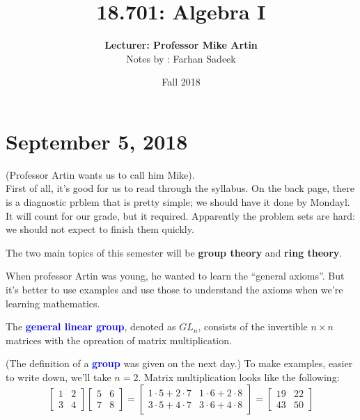 \documentclass[11pt]{article}
\title{\textbf{18.701: Algebra I}}
\author{\textbf{Lecturer: Professor Mike Artin} \\ Notes by : Farhan Sadeek}
\date{Fall 2018}
\begin{document}
\maketitle
\section{September 5, 2018}
 (Professor Artin wants us to call him Mike). \\
First of all, it's good for us to read through the syllabus. On the back page, there is a diagnostic prblem that is pretty simple; we should have it done by Mondayl. It will count for our grade, but it  required. Apparently the problem sets are hard: we should not expect to finish them quickly.
\begin{fact}
    The two main topics of this semester will be \textbf{group theory} and \textbf{ring theory}.
\end{fact}
When professor Artin was young, he wanted to learn the ``general axioms''. But it's better to use examples and use those to understand the axioms when we're learning mathematics.

\begin{definition}
    The \textcolor{blue}{\textbf{general linear group}}, denoted as $GL_n$, consists of the invertible $n \times n$ matrices with the opreation of matrix multiplication.
\end{definition}

(The definition of a \textcolor{blue}{\textbf{group}} was given on the next day.) To make examples, easier to write down, we'll take $n = 2$. Matrix multiplication looks like the following:
\[
    \begin{bmatrix}
        1 & 2 \\
        3 & 4
    \end{bmatrix}
    \begin{bmatrix}
        5 & 6 \\
        7 & 8
    \end{bmatrix}
    =
    \begin{bmatrix}
        1 \cdot 5 + 2 \cdot 7 & 1 \cdot 6 + 2 \cdot 8 \\
        3 \cdot 5 + 4 \cdot 7 & 3 \cdot 6 + 4 \cdot 8
    \end{bmatrix}
    =
    \begin{bmatrix}
        19 & 22 \\
        43 & 50
    \end{bmatrix}
\]
\end{document}
